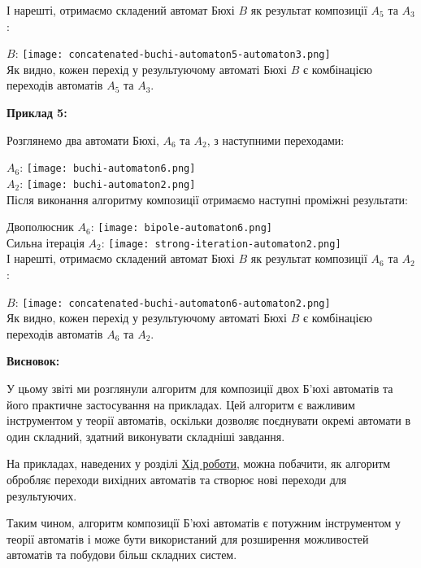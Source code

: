 \documentclass[12pt,a4paper]{article}
\newcommand{\textref}[2]{\hyperref[#1]{#2}}
\begin{document}
І нарешті, отримаємо складений автомат Бюхі \(B\) як результат композиції \(A_5\) та \(A_3\):

\(B\):
\texttt{[image: concatenated-buchi-automaton5-automaton3.png]} \\

Як видно, кожен перехід у результуючому автоматі Бюхі \(B\) є комбінацією переходів автоматів \(A_5\) та \(A_3\).

\newpage

\vspace{1em}
\textbf{Приклад 5:}
\vspace{0.5em}

Розглянемо два автомати Бюхі, \(A_6\) та \(A_2\), з наступними переходами:

\(A_6\):
\texttt{[image: buchi-automaton6.png]} \\

\(A_2\):
\texttt{[image: buchi-automaton2.png]} \\

Після виконання алгоритму композиції отримаємо наступні проміжні результати:

Двополюсник \(A_6\):
\texttt{[image: bipole-automaton6.png]} \\

Сильна ітерація \(A_2\):
\texttt{[image: strong-iteration-automaton2.png]} \\

І нарешті, отримаємо складений автомат Бюхі \(B\) як результат композиції \(A_6\) та \(A_2\):

\(B\):
\texttt{[image: concatenated-buchi-automaton6-automaton2.png]} \\

Як видно, кожен перехід у результуючому автоматі Бюхі \(B\) є комбінацією переходів автоматів \(A_6\) та \(A_2\).

\newpage

\vspace{1em}
\textbf{Висновок:}
\vspace{0.5em}

У цьому звіті ми розглянули алгоритм для композиції двох Б'юхі автоматів та його практичне застосування на прикладах. Цей алгоритм є важливим інструментом у теорії автоматів, оскільки дозволяє поєднувати окремі автомати в один складний, здатний виконувати складніші завдання.

На прикладах, наведених у розділі \textref{sec:progress}{Хід роботи}, можна побачити, як алгоритм обробляє переходи вихідних автоматів та створює нові переходи для результуючих.

Таким чином, алгоритм композиції Б'юхі автоматів є потужним інструментом у теорії автоматів і може бути використаний для розширення можливостей автоматів та побудови більш складних систем.
\end{document}

